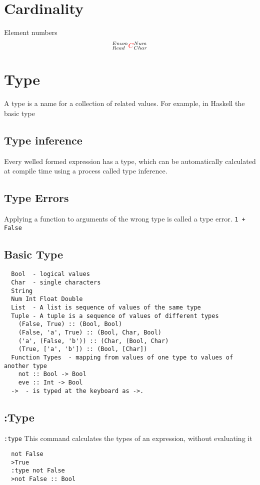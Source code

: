 \documentclass[a4paper,12pt]{article}
\theoremstyle{definition}
\begin{document}
\section{Cardinality} Element numbers
{\Large
  \begin{equation}
    ^{Enum}_{Read}{\color{red}C}^{Num}_{Char}
  \end{equation}
}

\section{Type} A type is a name for a collection of related values. For example, in Haskell the basic type

\subsection{Type inference} Every welled formed expression has a type, which can be automatically calculated at compile time using a process called type inference.

\subsection{Type Errors} Applying a function to arguments of the wrong type is called a type error. 
\lstinline!1 + False!

\subsection{Basic Type}
\begin{lstlisting}
  Bool  - logical values 
  Char  - single characters 
  String 
  Num Int Float Double
  List  - A list is sequence of values of the same type
  Tuple - A tuple is a sequence of values of different types
    (False, True) :: (Bool, Bool)
    (False, 'a', True) :: (Bool, Char, Bool)
    ('a', (False, 'b')) :: (Char, (Bool, Char)
    (True, ['a', 'b']) :: (Bool, [Char]) 
  Function Types  - mapping from values of one type to values of another type
    not :: Bool -> Bool
    eve :: Int -> Bool
  ->  - is typed at the keyboard as ->.
\end{lstlisting}

\subsection{:Type} \lstinline!:type! This command calculates the types of an expression, without evaluating it
\begin{lstlisting}
  not False 
  >True 
  :type not False 
  >not False :: Bool
\end{lstlisting}
\end{document}
